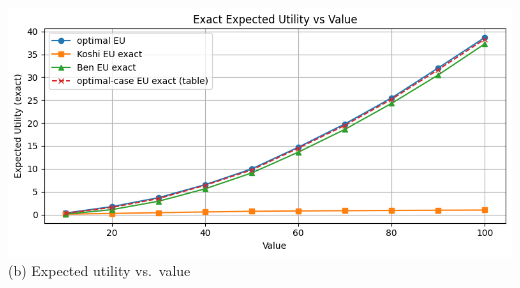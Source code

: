 \documentclass[11pt]{article}
\begin{document}
\includegraphics[width=1\linewidth]{332Project1/figures/utility.png}
\vspace{0.4em}
{\footnotesize (b) Expected utility vs.\ value}
\end{document}
